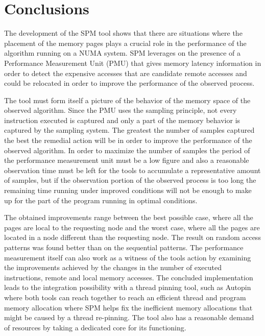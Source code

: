 \chapter[Conclusions and Possibilities of Future Work]{Conclusions}\label{chapter:conclusions}

The development of the SPM tool shows that there are situations where the placement of the memory pages plays a crucial role in the performance of the algorithm running on a NUMA system. SPM leverages on the presence of a Performance Measurement Unit (PMU) that gives memory latency information in order to detect the expensive accesses that are candidate remote accesses and could be relocated in order to improve the performance of the observed process.

The tool must form itself a picture of the behavior of the memory space of the observed algorithm. Since the PMU uses the sampling principle, not every instruction executed is captured and only a part of the memory behavior is captured by the sampling system. The greatest the number of samples captured the best the remedial action will be in order to improve the performance of the observed algorithm. In order to maximize the number of samples the period of the performance measurement unit must be a low figure and also a reasonable observation time must be left for the tools to accumulate a representative amount of samples, but if the observation portion of the observed process is too long the remaining time running under improved conditions will not be enough to make up for the part of the program running in optimal conditions.

The obtained improvements range between the best possible case, where all the pages are local to the requesting node and the worst case, where all the pages are located in a node different than the requesting node. The result on random access patterns was found better than on the sequential patterns. The performance measurement itself can also work as a witness of the tools action by examining the improvements achieved by the changes in the number of executed instructions, remote and local memory accesses.
The concluded implementation leads to the integration possibility with a thread pinning tool, such as Autopin where both tools can reach together to reach an efficient thread and program memory allocation where SPM helps fix the inefficient memory allocations that might be caused by a thread re-pinning. The tool also has a reasonable demand of resources by taking a dedicated core for its functioning.


